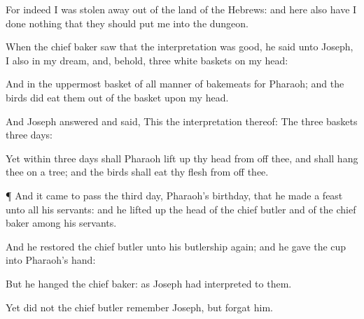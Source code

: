 {For indeed I was stolen
away out of the
land of the
Hebrews: and here also have I
done
nothing that they should
put me into the
dungeon.

When the
chief
baker
saw that the
interpretation was
good, he
said unto
Joseph, I
also
{} in my
dream, and, behold,
{}
three
white
baskets on my
head:

And in the
uppermost
basket
{} of all
manner of
bakemeats for
Pharaoh; and the
birds did
eat them out of the
basket
upon my
head.

And
Joseph
answered and
said, This
{} the
interpretation thereof: The
three
baskets
{}
three
days:

Yet within
three
days shall
Pharaoh lift
up thy
head from off thee, and shall
hang thee on a
tree; and the
birds shall
eat thy
flesh from off thee.


\par }{\PP {}¶ And it came to pass the
third
day,
{}
Pharaoh’s
birthday, that he
made a
feast unto all his
servants: and he lifted
up the
head of the
chief
butler and of the
chief
baker
among his
servants.

And he
restored the
chief
butler unto his
butlership
again; and he
gave the
cup into
Pharaoh’s
hand:

But he
hanged the
chief
baker: as
Joseph had
interpreted to them.

Yet did not the
chief
butler
remember
Joseph, but
forgat him.




\par }
